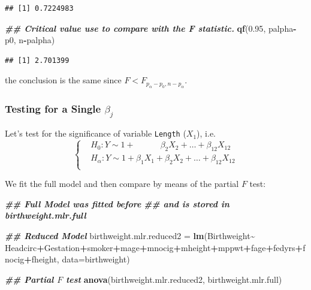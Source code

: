 \documentclass[
]{book}
\newenvironment{Shaded}{\begin{snugshade}}{\end{snugshade}}
\newcommand{\AttributeTok}[1]{\textcolor[rgb]{0.13,0.29,0.53}{#1}}
\newcommand{\DocumentationTok}[1]{\textcolor[rgb]{0.56,0.35,0.01}{\textbf{\textit{#1}}}}
\newcommand{\FloatTok}[1]{\textcolor[rgb]{0.00,0.00,0.81}{#1}}
\newcommand{\FunctionTok}[1]{\textcolor[rgb]{0.13,0.29,0.53}{\textbf{#1}}}
\newcommand{\NormalTok}[1]{#1}
\newcommand{\OtherTok}[1]{\textcolor[rgb]{0.56,0.35,0.01}{#1}}
\newcommand{\SpecialCharTok}[1]{\textcolor[rgb]{0.81,0.36,0.00}{\textbf{#1}}}
\begin{document}
\begin{verbatim}
## [1] 0.7224983
\end{verbatim}

\begin{Shaded}
\begin{Highlighting}[]
\DocumentationTok{\#\# Critical value use to compare with the F statistic.}
\FunctionTok{qf}\NormalTok{(}\FloatTok{0.95}\NormalTok{, palpha}\SpecialCharTok{{-}}\NormalTok{p0, n}\SpecialCharTok{{-}}\NormalTok{palpha)}
\end{Highlighting}
\end{Shaded}

\begin{verbatim}
## [1] 2.701399
\end{verbatim}

the conclusion is the same since \(F < F_{p_{\alpha}-p_0, n-p_{\alpha}}\).

\subsubsection{\texorpdfstring{Testing for a Single \(\beta_j\)}{Testing for a Single \textbackslash beta\_j}}\label{testing-for-a-single-beta_j}

Let's test for the significance of variable \texttt{Length} (\(X_1\)), i.e.
\[\begin{cases}
 &H_0: Y \sim  1 + \qquad \quad  \beta_2 X_2 + \ldots + \beta_{12}X_{12} \\
 & H_{\alpha}:  Y \sim  1+  \beta_1 X_1+  \beta_2 X_2 + \ldots + \beta_{12} X_{12} \\
 \end{cases} 
 \]

We fit the full model and then compare by means of the partial \(F\) test:

\begin{Shaded}
\begin{Highlighting}[]
\DocumentationTok{\#\# Full Model was fitted before }
\DocumentationTok{\#\# and is stored in birthweight.mlr.full}

\DocumentationTok{\#\# Reduced Model }
\NormalTok{birthweight.mlr.reduced2 }\OtherTok{=} \FunctionTok{lm}\NormalTok{(Birthweight}\SpecialCharTok{\textasciitilde{}}\NormalTok{ Headcirc}\SpecialCharTok{+}\NormalTok{Gestation}\SpecialCharTok{+}\NormalTok{smoker}\SpecialCharTok{+}\NormalTok{mage}\SpecialCharTok{+}\NormalTok{mnocig}\SpecialCharTok{+}\NormalTok{mheight}\SpecialCharTok{+}\NormalTok{mppwt}\SpecialCharTok{+}\NormalTok{fage}\SpecialCharTok{+}\NormalTok{fedyrs}\SpecialCharTok{+}\NormalTok{fnocig}\SpecialCharTok{+}\NormalTok{fheight,  }\AttributeTok{data=}\NormalTok{birthweight)}

\DocumentationTok{\#\# Partial $F$ test}
\FunctionTok{anova}\NormalTok{(birthweight.mlr.reduced2, birthweight.mlr.full)}
\end{Highlighting}
\end{Shaded}
\end{document}
